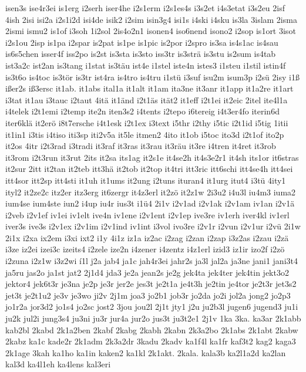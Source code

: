 {isen3s
ise4r3ei
is1erg
i2serh
iser4he
i2s1erm
i2s1es4s
i3s2et
i4s3etat
i3s2eu
2isf
4ish
2isi
isi2a
i2s1i2d
isi4de
isik2
i2sim
isin3g4
isi1s
i4ski
i4sku
is3la
3islam
2isma
2ismi
ismu2
is1of
i3soh
1i2sol
2is4o2n1
isonen4
iso6nend
isono2
i2sop
is1ort
3isot
i2s1ou
2isp
is1pa
i2spar
is2pat
is1pe
is1pic
is2por
i2spro
is3sa
is4s1ac
is4sau
is6s5chen
isser4f
iss2po
is2st
is3sta
is3sto
iss3tr
is3strä
is3stu
is2sum
is4tab
ist3a2c
ist2an
is3tang
i1stat
is3täu
ist4e
i1stel
iste4n
istes3
i1steu
i1stil
istin4f
is3t6o
is4toc
is3tör
is3tr
ist4ra
is4tro
is4tru
i1stü
i3suf
isu2m
isum3p
i2sü
2isy
i1ß
ißer2s
iß3ersc
it1ab.
it1abs
ital1a
it1alt
it1am
ita3ne
it3anr
it1app
it1a2re
it1art
i3tat
it1au
i3tauc
i2taut
4itä
it1änd
i2t1äs
ität2
it1eff
i2t1ei
it2eic
2itel
ite4l1a
i4telek
i2t1emi
i2temp
ite2n
iten3s2
i4tents
i2tepo
i6tereig
i4t3er4fo
iterin6d
iter6klä
it2erö
i8t7ersche
i4t1esk
i2t1ex
i3text
i5thr
i2thy
i5tic
i2t1id
i5tig
1itii
it1in1
i3tis
i4tiso
iti3sp
iti2v5a
it5le
itmen2
4ito
it1ob
i5toc
ito3d
i2t1of
ito2p
it2os
4itr
i2t3rad
i3tradi
it3raf
it3ras
it3rau
it3räu
it3re
i4tren
it4ret
it3rob
it3rom
i2t3run
it3rut
2its
it2sa
its1ag
it2s1e
it4se2h
it4s3e2r1
it4sh
its1or
it6stras
it2sur
2itt
it2tan
it2teb
itt3hä
it2tob
it2top
it4tri
itt3ric
itt6schi
itt4se4h
itt4sei
itt4sor
itt2sp
itt4sti
it1uh
it1ums
it2ung
i2tuns
ituran4
it1urg
itut4
i3tü
4ity1
ityl2
it2ze2c
itz2er
itz3erg
it6zergr
it4z3erl
it2zö
it2z1w
2i3u2
i4u3l
iu4m3
iuma2
ium4se
ium4ste
iun2
i4up
iu4r
ius3t
i1ü4
2i1v
i2v1ad
i2v1ak
i2v1am
iv1an
i2v1ä
i2veb
i2v1ef
iv1ei
iv1elt
ive4n
iv1ene
i2v1ent
i2v1ep
ive3re
iv1erh
iver4kl
iv1erl
iver3s
ive3s
i2v1ex
i2v1im
i2v1ind
iv1int
i3vol
ivo3re
i2v1r
i2vun
i2v1ur
i2vü
2i1w
2i1x
i2xa
ix2em
i3xi
ixt2
i1y
4i1z
iz1a
iz2ac
i2zag
i2zan
i2zap
i3z2as
i2zau
i2zä
i3ze
iz2ei
izei3c
izeits4
i2zele
ize2n
i4zener
i4zentz
i4z1erl
izid3
iz1ir
izo2f
i2zö
i2zuna
i2z1w
i3z2wi
í1l
j2a
jab4
ja1c
jah4r3ei
jahr2s
ja3l
jal2a
ja3ne
jani1
jani3t4
ja5ru
jas2o
ja1st
jat2
2j1d4
jda3
je2a
jean2s
je2g
jek4ta
jek4ter
jek4tin
jekt3o2
jektor4
jek6t3r
je3na
je2p
je3r
jer2e
jes3t
je2t1a
je4t3h
je2tin
je4tor
je2t3r
jet3s2
jet3t
je2t1u2
je3v
je3wo
ji2v
2j1m
joa3
jo2b1
job3r
jo2da
jo2i
jol2a
jong2
jo2p3
jo1r2a
jor3d2
jo1s4
jo2sc
jost2
3jou
jou2l
2j1t
jty1
j2u
ju2b3l
jugen6
jugend3
ju1i
ju2k
jul2i
jung3s4
ju3ni
ju3r
jur4a
jur2o
jus3t
ju3t2e1
2j1v
1ka
3ka.
ka3ar
2k1abb
kab2bl
2kabd
2k1a2ben
2kabf
2kabg
2kabh
2kabn
2k3a2bo
2k1abs
2k1abt
2kabw
2kabz
ka1c
kade2r
2k1adm
2k3a2dr
3kadu
2kadv
ka1f4l
ka1fr
kaf3t2
kag2
kaga3
2k1age
3kah
ka1ho
ka1in
kaken2
ka1kl
2k1akt.
2kala.
kala3b
ka2l1a2d
ka2lan
kal3d
ka4l1eh
ka4lens
kal3eri
}
